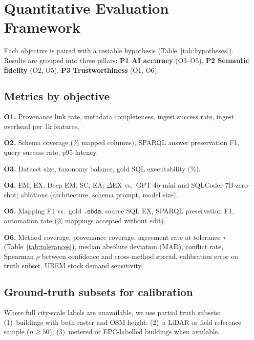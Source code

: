 \section{Quantitative Evaluation Framework}
\label{sec:evaluation}

Each objective is paired with a testable hypothesis (Table~\ref{tab:hypotheses}).
Results are grouped into three pillars:
\textbf{P1 AI accuracy} (O3--O5),
\textbf{P2 Semantic fidelity} (O2, O5),
\textbf{P3 Trustworthiness} (O1, O6).



\subsection{Metrics by objective}

\textbf{O1.} Provenance link rate, metadata completeness, ingest success rate, ingest overhead per 1k features.

\textbf{O2.} Schema coverage (\% mapped columns), SPARQL answer preservation F1, query success rate, p95 latency.

\textbf{O3.} Dataset size, taxonomy balance, gold SQL executability (\%).

\textbf{O4.} EM, EX, Deep EM, SC, EA; $\Delta$EX vs.\ GPT-4o-mini and SQLCoder-7B zero-shot; ablations (architecture, schema prompt, model size).

\textbf{O5.} Mapping F1 vs.\ gold \texttt{.obda}, source SQL EX, SPARQL preservation F1, automation rate (\% mappings accepted without edit).

\textbf{O6.} Method coverage, provenance coverage, agreement rate at tolerance $\tau$ (Table~\ref{tab:tolerances}), median absolute deviation (MAD), conflict rate, Spearman $\rho$ between confidence and cross-method spread, calibration error on truth subset, UBEM stock demand sensitivity.



\subsection{Ground-truth subsets for calibration}

Where full city-scale labels are unavailable, we use partial truth subsets:
(1)~buildings with both raster and OSM height;
(2)~a LiDAR or field reference sample ($n \geq 50$);
(3)~metered or EPC-labelled buildings when available.
